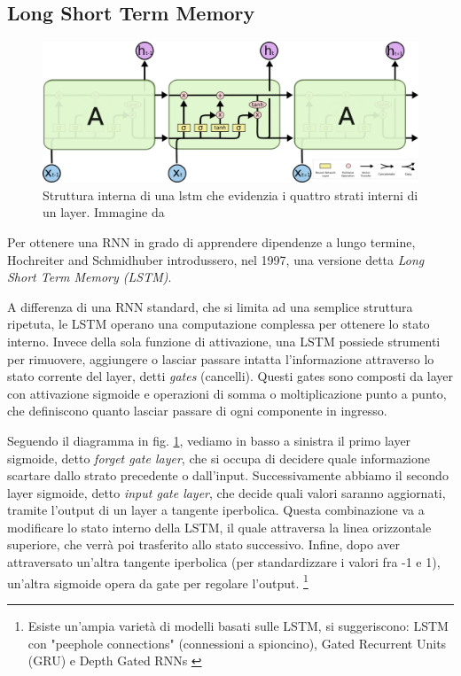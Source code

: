 \subsection{Long Short Term Memory}
\label{sub:lstm}
\begin{figure}[ht]
	\centering
	\includegraphics{img/lstm_struct.png}
	\caption{Struttura interna di una lstm che evidenzia i quattro strati interni di un layer. Immagine da \cite{LSTM}}
	\label{fig:1.9}
\end{figure}
Per ottenere una RNN in grado di apprendere dipendenze a lungo termine, Hochreiter and Schmidhuber \cite{vanishing} introdussero, nel 1997, una versione detta \textit{Long Short Term Memory (LSTM)}.

A differenza di una RNN standard, che si limita ad una semplice struttura ripetuta, le LSTM operano una computazione complessa per ottenere lo stato interno. Invece della sola funzione di attivazione, una LSTM possiede strumenti per rimuovere, aggiungere o lasciar passare intatta l'informazione attraverso lo stato corrente del layer, detti \textit{gates} (cancelli). Questi gates sono composti da layer con attivazione sigmoide e operazioni di somma o moltiplicazione punto a punto, che definiscono quanto lasciar passare di ogni componente in ingresso.

Seguendo il diagramma in fig. \ref{fig:1.9}, vediamo in basso a sinistra il primo layer sigmoide, detto \textit{forget gate layer}, che si occupa di decidere quale informazione scartare dallo strato precedente o dall'input. Successivamente abbiamo il secondo layer sigmoide, detto \textit{input gate layer}, che decide quali valori saranno aggiornati, tramite l'output di un layer a tangente iperbolica. Questa combinazione va a modificare lo stato interno della LSTM, il quale attraversa la linea orizzontale superiore, che verrà poi trasferito allo stato successivo. Infine, dopo aver attraversato un'altra tangente iperbolica (per standardizzare i valori fra -1 e 1), un'altra sigmoide opera da gate per regolare l'output. \footnote{Esiste un'ampia varietà di modelli basati sulle LSTM, si suggeriscono: LSTM con "peephole connections" \cite{peephole} (connessioni a spioncino), Gated Recurrent Units (GRU) \cite{GRU} e Depth Gated RNNs \cite{DGRNN}}
